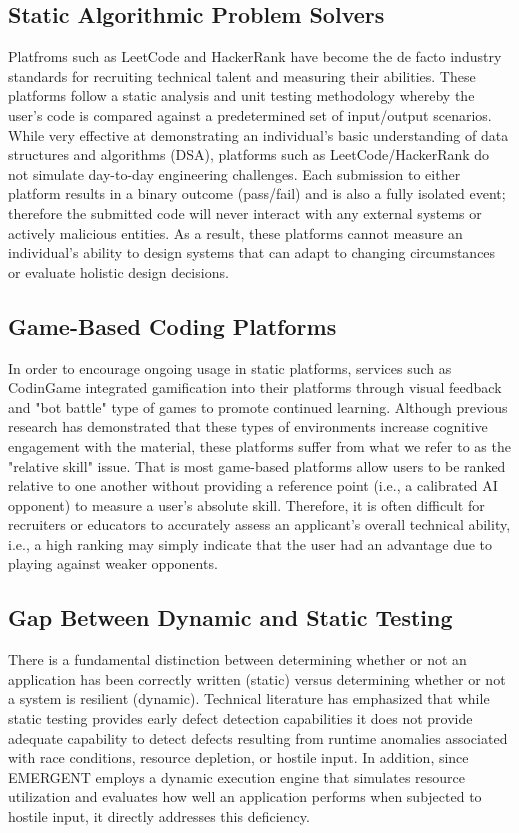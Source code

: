 \documentclass[12pt,a4paper]{report}
\begin{document}
\subsection {Static Algorithmic Problem Solvers}
Platfroms such as LeetCode and HackerRank have become the de facto industry standards for recruiting technical talent and measuring their abilities. These platforms follow a static analysis and unit testing methodology whereby the user's code is compared against a predetermined set of input/output scenarios. While very effective at demonstrating an individual's basic understanding of data structures and algorithms (DSA), platforms such as LeetCode/HackerRank do not simulate day-to-day engineering challenges. Each submission to either platform results in a binary outcome (pass/fail) and is also a fully isolated event; therefore the submitted code will never interact with any external systems or actively malicious entities. As a result, these platforms cannot measure an individual's ability to design systems that can adapt to changing circumstances or evaluate holistic design decisions.

\subsection {Game-Based Coding Platforms}
In order to encourage ongoing usage in static platforms, services such as CodinGame integrated gamification into their platforms through visual feedback and "bot battle" type of games to promote continued learning. Although previous research has demonstrated that these types of environments increase cognitive engagement with the material, these platforms suffer from what we refer to as the "relative skill" issue. That is most game-based platforms allow users to be ranked relative to one another without providing a reference point (i.e., a calibrated AI opponent) to measure a user's absolute skill. Therefore, it is often difficult for recruiters or educators to accurately assess an applicant's overall technical ability, i.e., a high ranking may simply indicate that the user had an advantage due to playing against weaker opponents.

\subsection {Gap Between Dynamic and Static Testing} 
There is a fundamental distinction between determining whether or not an application has been correctly written (static) versus determining whether or not a system is resilient (dynamic). Technical literature has emphasized that while static testing provides early defect detection capabilities it does not provide adequate capability to detect defects resulting from runtime anomalies associated with race conditions, resource depletion, or hostile input. In addition, since EMERGENT employs a dynamic execution engine that simulates resource utilization and evaluates how well an application performs when subjected to hostile input, it directly addresses this deficiency.
\end{document}
